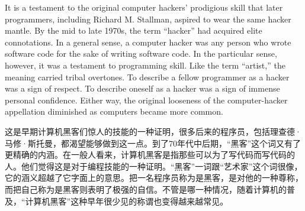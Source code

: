
\ifdefined\eng
It is a testament to the original computer hackers' prodigious skill that later programmers, including Richard M. Stallman, aspired to wear the same hacker mantle. By the mid to late 1970s, the term ``hacker'' had acquired elite connotations. In a general sense, a computer hacker was any person who wrote software code for the sake of writing software code. In the particular sense, however, it was a testament to programming skill. Like the term ``artist,'' the meaning carried tribal overtones. To describe a fellow programmer as a hacker was a sign of respect. To describe oneself as a hacker was a sign of immense personal confidence. Either way, the original looseness of the computer-hacker appellation diminished as computers became more common.
\fi

\ifdefined\chs
这是早期计算机黑客们惊人的技能的一种证明，很多后来的程序员，包括理查德·马修·斯托曼，都渴望能够做到这一点。到了70年代中后期，“黑客”这个词又有了更精确的内涵。在一般人看来，计算机黑客是指那些可以为了写代码而写代码的人。他们觉得这是对于编程技能的一种证明。“黑客”一词跟“艺术家”这个词很像，它的涵义超越了它字面上的意思。把一名程序员称为是黑客，是对他的一种尊称，而把自己称为是黑客则表明了极强的自信。不管是哪一种情况，随着计算机的普及，“计算机黑客”这种早年很少见的称谓也变得越来越常见。
\fi

